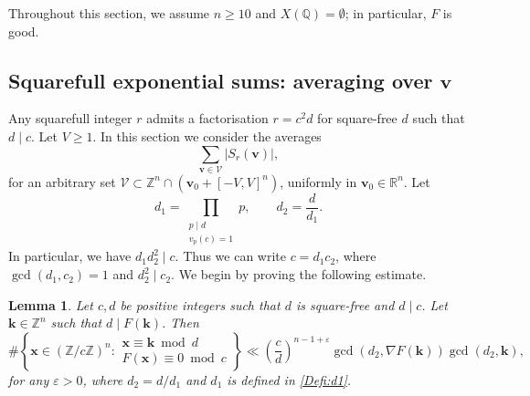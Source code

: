 \documentclass[a4paper,11pt, twoside,reqno]{amsart}
\theoremstyle{plain}
\newtheorem{lemma}[thm]{Lemma}
\theoremstyle{definition}
\theoremstyle{remark}
\newcommand{\bfv}{\bm{v}}
\newcommand{\ZZ}{\mathbb{Z}}
\newcommand{\RR}{\mathbb{R}}
\newcommand{\QQ}{\mathbb{Q}}
\newcommand{\ve}{\varepsilon}
\renewcommand{\ge}{\geqslant}
\renewcommand{\geq}{\geqslant}
\numberwithin{equation}{section}
\begin{document}
Throughout this section, we assume $n\ge10$ and $X(\QQ)=\emptyset$;
in particular, $F$ is good.

\subsection{Squarefull exponential sums: averaging over $\bm{v}$} 

Any squarefull integer $r$ admits a factorisation $r=c^2d$ for square-free $d$ such that $d\mid c$. Let $V\geq 1$. In this section we consider the averages
$$
\sum_{\bm{v}\in \mathcal{V}} |S_r(\bm{v})|,
$$
for an arbitrary set
$\mathcal V\subset\ZZ^n\cap(\bfv_0+[-V,V]^n)$,
uniformly in $\bfv_0\in\RR^n$.
Let 
\begin{equation}\label{Defi:d1}
d_1=\prod_{\substack{p\mid d \\ v_p(c)=1}}p, \qquad d_2=\frac{d}{d_1}.
\end{equation}
In particular, we have 
$d_1d_2^2\mid c$. Thus we can 
write $c=d_1c_2$, where $\gcd(d_1,c_2)=1$ and $d_2^2\mid c_2$. 
We begin by proving the following estimate.


\begin{lemma}\label{lem:c/d-bound}
Let $c,d$ be positive integers such that $d$ is square-free and $d\mid c$.
Let $\bm{k}\in \ZZ^n$ such that $d\mid F(\bm{k})$. 
Then
$$
\#\left\{ \bm{x}\in (\ZZ/c\ZZ)^n: 
\begin{array}{l}
\bm{x}\equiv \bm{k}\bmod{d}\\
F(\bm{x})\equiv 0\bmod{c}
\end{array}
\right\}\ll \left(\frac{c}{d}\right)^{n-1+\ve} 
\gcd(d_2,\nabla F(\bm{k}))\gcd(d_2,\bm{k}),
$$
for any $\ve>0$, where $d_2=d/d_1$ and $d_1$ is defined in \eqref{Defi:d1}.
\end{lemma}
\end{document}
